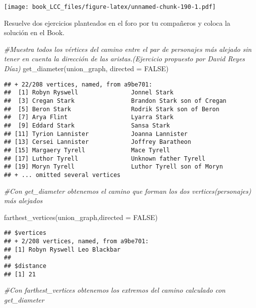 \documentclass[
]{book}
\newenvironment{Shaded}{\begin{snugshade}}{\end{snugshade}}
\newcommand{\AttributeTok}[1]{\textcolor[rgb]{0.77,0.63,0.00}{#1}}
\newcommand{\CommentTok}[1]{\textcolor[rgb]{0.56,0.35,0.01}{\textit{#1}}}
\newcommand{\ConstantTok}[1]{\textcolor[rgb]{0.00,0.00,0.00}{#1}}
\newcommand{\FunctionTok}[1]{\textcolor[rgb]{0.00,0.00,0.00}{#1}}
\newcommand{\NormalTok}[1]{#1}
\begin{document}
\texttt{[image: book\_LCC\_files/figure-latex/unnamed-chunk-190-1.pdf]}

Resuelve dos ejercicios planteados en el foro por tu compañeros y coloca la solución en el Book.

\begin{Shaded}
\begin{Highlighting}[]
\CommentTok{\#Muestra todos los vértices del camino entre el par de personajes más alejado sin tener en cuenta la dirección de las aristas.(Ejercicio propuesto por David Reyes Díaz)}
\FunctionTok{get\_diameter}\NormalTok{(union\_graph, }\AttributeTok{directed =} \ConstantTok{FALSE}\NormalTok{)}
\end{Highlighting}
\end{Shaded}

\begin{verbatim}
## + 22/208 vertices, named, from a9be701:
##  [1] Robyn Ryswell               Jonnel Stark               
##  [3] Cregan Stark                Brandon Stark son of Cregan
##  [5] Beron Stark                 Rodrik Stark son of Beron  
##  [7] Arya Flint                  Lyarra Stark               
##  [9] Eddard Stark                Sansa Stark                
## [11] Tyrion Lannister            Joanna Lannister           
## [13] Cersei Lannister            Joffrey Baratheon          
## [15] Margaery Tyrell             Mace Tyrell                
## [17] Luthor Tyrell               Unknown father Tyrell      
## [19] Moryn Tyrell                Luthor Tyrell son of Moryn 
## + ... omitted several vertices
\end{verbatim}

\begin{Shaded}
\begin{Highlighting}[]
\CommentTok{\#Con get\_diameter obtenemos el camino que forman los dos vertices(personajes) más alejados}

\FunctionTok{farthest\_vertices}\NormalTok{(union\_graph,}\AttributeTok{directed =} \ConstantTok{FALSE}\NormalTok{)}
\end{Highlighting}
\end{Shaded}

\begin{verbatim}
## $vertices
## + 2/208 vertices, named, from a9be701:
## [1] Robyn Ryswell Leo Blackbar 
## 
## $distance
## [1] 21
\end{verbatim}

\begin{Shaded}
\begin{Highlighting}[]
\CommentTok{\#Con farthest\_vertices obtenemos los extremos del camino calculado con get\_diameter}
\end{Highlighting}
\end{Shaded}
\end{document}
